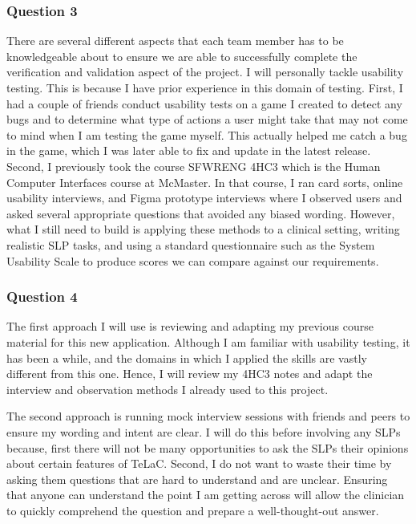 \documentclass[12pt, titlepage]{article}
\renewcommand{\_}{\oldunderscore\allowbreak}
\begin{document}
\subsubsection*{Question 3}
There are several different aspects that each team member has to be knowledgeable about to ensure we are able to successfully complete the verification and validation aspect of the project. 
I will personally tackle usability testing. 
This is because I have prior experience in this domain of testing. 
First, I had a couple of friends conduct usability tests on a game I created to detect any bugs and to determine what type of actions a user might take that may not come to mind when I am testing the game myself. 
This actually helped me catch a bug in the game, which I was later able to fix and update in the latest release. 
Second, I previously took the course SFWRENG 4HC3 which is the Human Computer Interfaces course at McMaster. 
In that course, I ran card sorts, online usability interviews, and Figma prototype interviews where I observed users and asked several appropriate questions that avoided any biased wording. 
However, what I still need to build is applying these methods to a clinical setting, writing realistic SLP tasks, and using a standard questionnaire such as the System Usability Scale to produce scores we can compare against our requirements.

\subsubsection*{Question 4}
The first approach I will use is reviewing and adapting my previous course material for this new application. 
Although I am familiar with usability testing, it has been a while, and the domains in which I applied the skills are vastly different from this one. 
Hence, I will review my 4HC3 notes and adapt the interview and observation methods I already used to this project.

The second approach is running mock interview sessions with friends and peers to ensure my wording and intent are clear. 
I will do this before involving any SLPs because, first there will not be many opportunities to ask the SLPs their opinions about certain features of TeLaC. 
Second, I do not want to waste their time by asking them questions that are hard to understand and are unclear. 
Ensuring that anyone can understand the point I am getting across will allow the clinician to quickly comprehend the question and prepare a well-thought-out answer.
\end{document}
